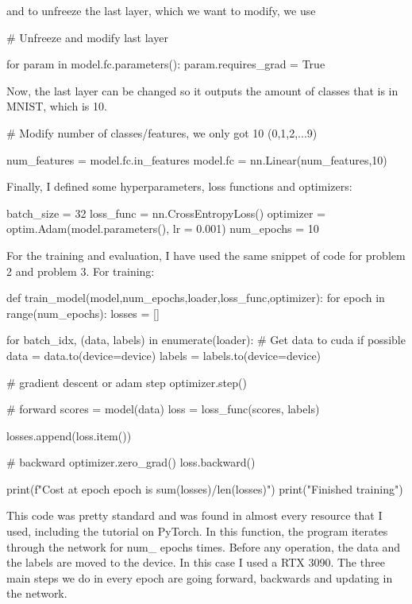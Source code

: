 \documentclass{article}
\numberwithin{equation}{section}
\numberwithin{equation}{section}
\begin{document}
and to unfreeze the last layer, which we want to modify, we use 


\begin{python}
# Unfreeze and modify last layer

for param in model.fc.parameters():
    param.requires_grad = True
    
\end{python}


Now, the last layer can be changed so it outputs the amount of classes that is in MNIST, which is 10.

\begin{python}
# Modify number of classes/features, we only got 10 (0,1,2,...9)

num_features = model.fc.in_features
model.fc = nn.Linear(num_features,10)
    
\end{python}

Finally, I defined some hyperparameters, loss functions and optimizers:

\begin{python}
batch_size = 32
loss_func = nn.CrossEntropyLoss()   
optimizer = optim.Adam(model.parameters(), lr = 0.001)   
num_epochs = 10

\end{python}



For the training and evaluation, I have used the same snippet of code for problem 2 and problem 3. For training:

\begin{python}
def train_model(model,num_epochs,loader,loss_func,optimizer):
    for epoch in range(num_epochs):
        losses = []

        for batch_idx, (data, labels) in enumerate(loader):
            # Get data to cuda if possible
            data = data.to(device=device)
            labels = labels.to(device=device)

            # gradient descent or adam step
            optimizer.step()

            # forward
            scores = model(data)
            loss = loss_func(scores, labels)

            losses.append(loss.item())

            # backward
            optimizer.zero_grad()
            loss.backward()  

        print(f"Cost at epoch {epoch} is {sum(losses)/len(losses)}")
    print("Finished training")

\end{python}
This code was pretty standard and was found in almost every resource that I used, including the tutorial on PyTorch. In this function, the program iterates through the network for num\_ epochs times. Before any operation, the data and the labels are moved to the device. In this case I used a RTX 3090. The three main steps we do in every epoch are going forward, backwards and updating in the network.
\end{document}
